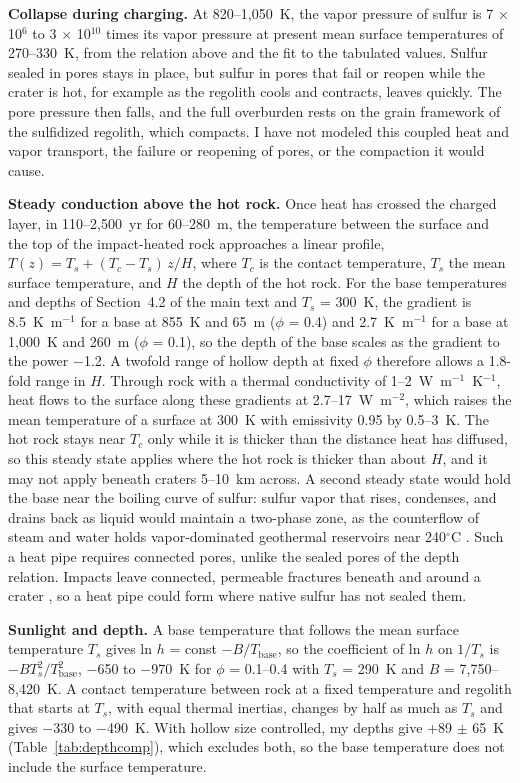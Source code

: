 \documentclass{planetary}
\begin{document}
\textbf{Collapse during charging.} At 820--1,050~K, the vapor pressure of sulfur is 7 $\times$ 10$^6$ to 3 $\times$ 10$^{10}$ times its vapor pressure at present mean surface temperatures of 270--330~K, from the relation above and the fit to the tabulated values. Sulfur sealed in pores stays in place, but sulfur in pores that fail or reopen while the crater is hot, for example as the regolith cools and contracts, leaves quickly. The pore pressure then falls, and the full overburden rests on the grain framework of the sulfidized regolith, which compacts. I have not modeled this coupled heat and vapor transport, the failure or reopening of pores, or the compaction it would cause.

\textbf{Steady conduction above the hot rock.} Once heat has crossed the charged layer, in 110--2,500~yr for 60--280~m, the temperature between the surface and the top of the impact-heated rock approaches a linear profile, $T(z) = T_s + (T_c - T_s)\, z/H$, where $T_c$ is the contact temperature, $T_s$ the mean surface temperature, and $H$ the depth of the hot rock. For the base temperatures and depths of Section~4.2 of the main text and $T_s$ = 300~K, the gradient is 8.5~K~m$^{-1}$ for a base at 855~K and 65~m ($\phi$ = 0.4) and 2.7~K~m$^{-1}$ for a base at 1,000~K and 260~m ($\phi$ = 0.1), so the depth of the base scales as the gradient to the power $-$1.2. A twofold range of hollow depth at fixed $\phi$ therefore allows a 1.8-fold range in $H$. Through rock with a thermal conductivity of 1--2~W~m$^{-1}$~K$^{-1}$, heat flows to the surface along these gradients at 2.7--17~W~m$^{-2}$, which raises the mean temperature of a surface at 300~K with emissivity 0.95 by 0.5--3~K. The hot rock stays near $T_c$ only while it is thicker than the distance heat has diffused, so this steady state applies where the hot rock is thicker than about $H$, and it may not apply beneath craters 5--10~km across. A second steady state would hold the base near the boiling curve of sulfur: sulfur vapor that rises, condenses, and drains back as liquid would maintain a two-phase zone, as the counterflow of steam and water holds vapor-dominated geothermal reservoirs near 240$^\circ$C \parencite{white1971}. Such a heat pipe requires connected pores, unlike the sealed pores of the depth relation. Impacts leave connected, permeable fractures beneath and around a crater \parencite{alexander2024}, so a heat pipe could form where native sulfur has not sealed them.

\textbf{Sunlight and depth.} A base temperature that follows the mean surface temperature $T_s$ gives ln $h$ = const $- B/T_\mathrm{base}$, so the coefficient of ln $h$ on $1/T_s$ is $-B T_s^2/T_\mathrm{base}^2$, $-$650 to $-$970~K for $\phi$ = 0.1--0.4 with $T_s$ = 290~K and $B$ = 7,750--8,420~K. A contact temperature between rock at a fixed temperature and regolith that starts at $T_s$, with equal thermal inertias, changes by half as much as $T_s$ and gives $-$330 to $-$490~K. With hollow size controlled, my depths give +89 $\pm$ 65~K (Table~\ref{tab:depthcomp}), which excludes both, so the base temperature does not include the surface temperature.
\end{document}
